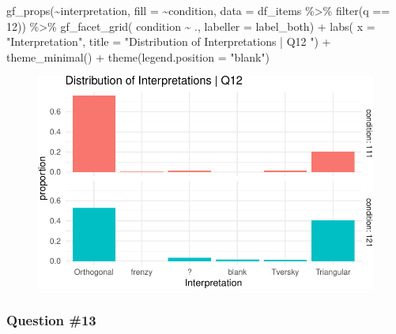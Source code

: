 \documentclass[
  letterpaper,
  DIV=11,
  numbers=noendperiod]{scrreprt}
\newenvironment{Shaded}{\begin{snugshade}}{\end{snugshade}}
\newcommand{\AttributeTok}[1]{\textcolor[rgb]{0.40,0.45,0.13}{#1}}
\newcommand{\DecValTok}[1]{\textcolor[rgb]{0.68,0.00,0.00}{#1}}
\newcommand{\FunctionTok}[1]{\textcolor[rgb]{0.28,0.35,0.67}{#1}}
\newcommand{\NormalTok}[1]{\textcolor[rgb]{0.00,0.23,0.31}{#1}}
\newcommand{\SpecialCharTok}[1]{\textcolor[rgb]{0.37,0.37,0.37}{#1}}
\newcommand{\StringTok}[1]{\textcolor[rgb]{0.13,0.47,0.30}{#1}}
\begin{document}
\begin{Shaded}
\begin{Highlighting}[]
\FunctionTok{gf\_props}\NormalTok{(}\SpecialCharTok{\textasciitilde{}}\NormalTok{interpretation, }\AttributeTok{fill =} \SpecialCharTok{\textasciitilde{}}\NormalTok{condition, }\AttributeTok{data =}\NormalTok{ df\_items }\SpecialCharTok{\%\textgreater{}\%} \FunctionTok{filter}\NormalTok{(q }\SpecialCharTok{==} \DecValTok{12}\NormalTok{)) }\SpecialCharTok{\%\textgreater{}\%} 
  \FunctionTok{gf\_facet\_grid}\NormalTok{( condition }\SpecialCharTok{\textasciitilde{}}\NormalTok{ ., }\AttributeTok{labeller =}\NormalTok{ label\_both) }\SpecialCharTok{+} 
  \FunctionTok{labs}\NormalTok{( }\AttributeTok{x =} \StringTok{"Interpretation"}\NormalTok{, }\AttributeTok{title =} \StringTok{"Distribution of Interpretations | Q12 "}\NormalTok{) }\SpecialCharTok{+} 
  \FunctionTok{theme\_minimal}\NormalTok{() }\SpecialCharTok{+} \FunctionTok{theme}\NormalTok{(}\AttributeTok{legend.position =} \StringTok{"blank"}\NormalTok{)}
\end{Highlighting}
\end{Shaded}

\begin{figure}[H]

{\centering \includegraphics{analysis/SGC3A/2_sgc3A_scoring_files/figure-pdf/Q12-distribution-2.pdf}

}

\end{figure}

\hypertarget{question-13}{%
\subsubsection{Question \#13}\label{question-13}}
\end{document}
